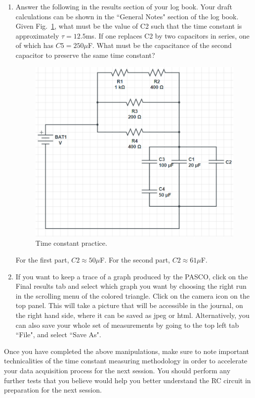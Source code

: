 \documentclass[12pt]{report}
\begin{document}
\begin{enumerate}
\item Answer the following in the results section of your log book. Your draft calculations can be shown in the ``General Notes" section of the log book. Given Fig.~\ref{Fig:lab2-session1-tau-practice}, what must be the value of C2 such that the time constant is approximately $\tau=12.5$ms. If one replaces C2 by two capacitors in series, one of which has $C5=250\mu$F. What must be the capacitance of the second capacitor to preserve the same time constant?
\begin{figure}[h]
\centering
\includegraphics[width=0.6\linewidth]{lab2-session1-Cpractice}
\caption{Time constant practice.}
\label{Fig:lab2-session1-tau-practice}
\end{figure}

\begin{tcolorbox}[title=Answer]
For the first part, $C2 \approx 50\mu$F. For the second part, $C2 \approx 61\mu$F.
\end{tcolorbox}

\item If you want to keep a trace of a graph produced by the PASCO, click on the Final results tab and select which graph you want by choosing the right run in the scrolling menu of the colored triangle. Click on the camera icon on the top panel. This will take a picture that will be accessible in the journal, on the right hand side, where it can be saved as jpeg or html. Alternatively, you can also save your whole set of measurements by going to the top left tab ``File", and select ``Save As".
\end{enumerate}

Once you have completed the above manipulations, make sure to note important technicalities of the time constant measuring methodology in order to accelerate your data acquisition process for the next session. You should perform any further tests that you believe would help you better understand the RC circuit in preparation for the next session.
\end{document}
